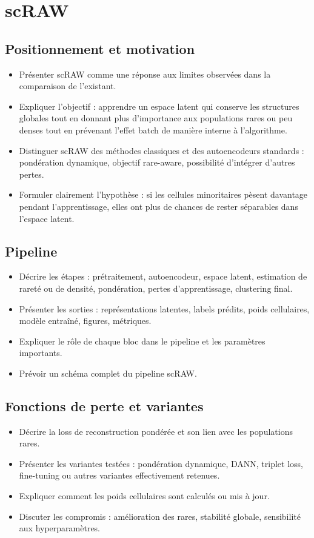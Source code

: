 \section{scRAW}

\subsection{Positionnement et motivation}
\begin{itemize}
  \item Présenter scRAW comme une réponse aux limites observées dans la comparaison de l'existant.
  \item Expliquer l'objectif : apprendre un espace latent qui conserve les structures globales tout en donnant plus d'importance aux populations rares ou peu denses tout en prévenant l'effet batch de manière interne à l'algorithme.
  \item Distinguer scRAW des méthodes classiques et des autoencodeurs standards : pondération dynamique, objectif rare-aware, possibilité d'intégrer d'autres pertes.
  \item Formuler clairement l'hypothèse : si les cellules minoritaires pèsent davantage pendant l'apprentissage, elles ont plus de chances de rester séparables dans l'espace latent.
\end{itemize}

\subsection{Pipeline}
\begin{itemize}
  \item Décrire les étapes : prétraitement, autoencodeur, espace latent, estimation de rareté ou de densité, pondération, pertes d'apprentissage, clustering final.
  \item Présenter les sorties : représentations latentes, labels prédits, poids cellulaires, modèle entraîné, figures, métriques.
  \item Expliquer le rôle de chaque bloc dans le pipeline et les paramètres importants.
  \item Prévoir un schéma complet du pipeline scRAW.
\end{itemize}

\subsection{Fonctions de perte et variantes}
\begin{itemize}
  \item Décrire la loss de reconstruction pondérée et son lien avec les populations rares.
  \item Présenter les variantes testées : pondération dynamique, DANN, triplet loss, fine-tuning ou autres variantes effectivement retenues.
  \item Expliquer comment les poids cellulaires sont calculés ou mis à jour.
  \item Discuter les compromis : amélioration des rares, stabilité globale, sensibilité aux hyperparamètres.
\end{itemize}

